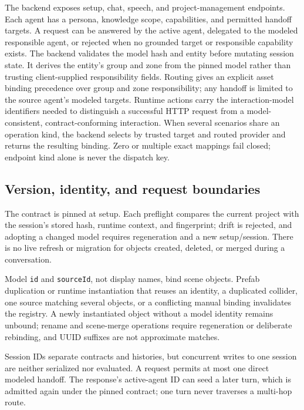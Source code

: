 The backend exposes setup, chat, speech, and project-management endpoints. Each
agent has a persona, knowledge scope, capabilities, and permitted handoff
targets. A request can be answered by the active agent, delegated to the modeled
responsible agent, or rejected when no grounded target or responsible
capability exists. The backend validates the model hash and entity before
mutating session state. It derives the entity's group and zone from the pinned
model rather than trusting client-supplied responsibility fields. Routing gives
an explicit asset binding precedence over group and zone responsibility; any
handoff is limited to the source agent's modeled targets. Runtime actions carry
the interaction-model identifiers needed to distinguish a successful HTTP
request from a model-consistent, contract-conforming interaction.
When several scenarios share an operation kind, the backend selects by trusted
target and routed provider and returns the resulting binding. Zero or multiple
exact mappings fail closed; endpoint kind alone is never the dispatch key.

\subsection{Version, identity, and request boundaries}

The contract is pinned at setup. Each preflight compares the current project
with the session's stored hash, runtime context, and fingerprint; drift is
rejected, and adopting a changed model requires regeneration and a new
setup/session. There is no live refresh or migration for objects created,
deleted, or merged during a conversation.

Model \texttt{id} and \texttt{sourceId}, not display names, bind scene objects.
Prefab duplication or runtime instantiation that reuses an identity, a
duplicated collider, one source matching several objects, or a conflicting
manual binding invalidates the registry. A newly instantiated object without a
model identity remains unbound; rename and scene-merge operations require
regeneration or deliberate rebinding, and UUID suffixes are not approximate
matches.

Session IDs separate contracts and histories, but concurrent writes to one
session are neither serialized nor evaluated. A request permits at most one
direct modeled handoff. The response's active-agent ID can seed a later turn,
which is admitted again under the pinned contract; one turn never traverses a
multi-hop route.

